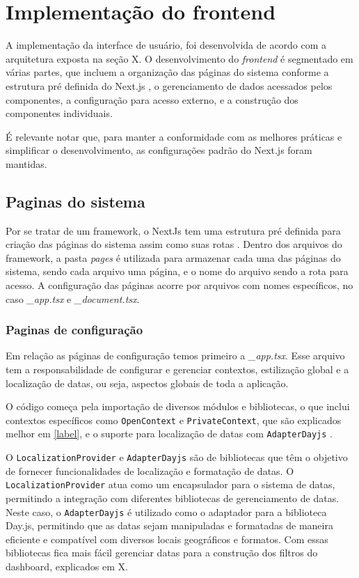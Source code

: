 \section[Implementação do frontend]{Implementação do frontend}\label{sec:implFront}

A implementação da interface de usuário, foi desenvolvida de acordo com a arquitetura exposta na seção X. O desenvolvimento do \textit{frontend} é segmentado em várias partes, que incluem a organização das páginas do sistema conforme a estrutura pré definida do Next.js \cite{nextjsDocs}, o gerenciamento de dados acessados pelos componentes, a configuração para acesso externo, e a construção dos componentes individuais.

É relevante notar que, para manter a conformidade com as melhores práticas e simplificar o desenvolvimento, as configurações padrão do Next.js foram mantidas.

\subsection{Paginas do sistema}\label{subsec:}
Por se tratar de um framework, o NextJs tem uma estrutura pré definida para criação das páginas do sistema assim como suas rotas \cite{nextjsDefiningRoutes}. Dentro dos arquivos do framework, a pasta \textit{pages} é utilizada para armazenar cada uma das páginas do sistema, sendo cada arquivo uma página, e o nome do arquivo sendo a rota para acesso. A configuração das páginas acorre por arquivos com nomes específicos, no caso \textit{\_app.tsx} e \textit{\_document.tsx}.

\subsubsection{Paginas de configuração}\label{subsec:configPage}
Em relação as páginas de configuração temos primeiro a \textit{\_app.tsx}. Esse arquivo tem a responsabilidade de configurar e gerenciar contextos, estilização global e a localização de datas, ou seja, aspectos globais de toda a aplicação.

O código começa pela importação de diversos módulos e bibliotecas, o que inclui contextos específicos como \texttt{OpenContext} e \texttt{PrivateContext}, que são explicados melhor em \ref{label}, e o suporte para localização de datas com \texttt{AdapterDayjs} \cite{dayJsInstallation}.

O \texttt{LocalizationProvider} e \texttt{AdapterDayjs} são de bibliotecas que têm o objetivo de fornecer funcionalidades de localização e formatação de datas. O \texttt{LocalizationProvider} atua como um encapsulador para o sistema de datas, permitindo a integração com diferentes bibliotecas de gerenciamento de datas. Neste caso, o \texttt{AdapterDayjs} é utilizado como o adaptador para a biblioteca Day.js, permitindo que as datas sejam manipuladas e formatadas de maneira eficiente e compatível com diversos locais geográficos e formatos. Com essas bibliotecas fica mais fácil gerenciar datas para a construção dos filtros do dashboard, explicados em X. %

